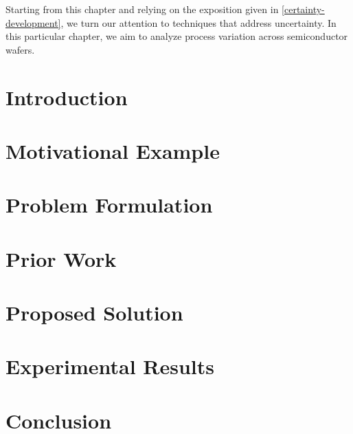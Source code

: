 Starting from this chapter and relying on the exposition given in
\cref{certainty-development}, we turn our attention to techniques that address
uncertainty. In this particular chapter, we aim to analyze process variation
across semiconductor wafers.

\section{Introduction}

\section{Motivational Example}

\section{Problem Formulation}

\section{Prior Work}

\section{Proposed Solution}

\section{Experimental Results}

\section{Conclusion}
